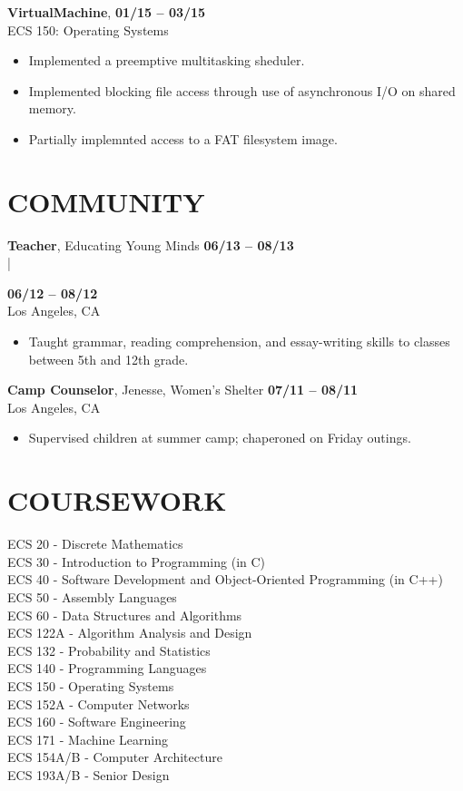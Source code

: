 \documentclass[line, letterpaper, 10pt]{res}
\begin{document}
\begin{resume}
    {\bf VirtualMachine}, \hfill  {\bf 01/15 -- 03/15} \\
    ECS 150: Operating Systems
    \begin{itemize} \itemsep -2pt
        \item Implemented a preemptive multitasking sheduler.
        \item Implemented blocking file access through use of asynchronous I/O on shared memory.
        \item Partially implemnted access to a FAT filesystem image.
    \end{itemize}

\section{COMMUNITY}
    {\bf Teacher}, Educating Young Minds \hfill {\bf 06/13 -- 08/13} \\
    |\raggedright{\hfill {\bf 06/12 -- 08/12}} \\
    Los Angeles, CA
    \begin{itemize} \itemsep -2pt
        \item Taught grammar, reading comprehension, and essay-writing skills to classes between 5th and 12th grade.
    \end{itemize}

    {\bf Camp Counselor}, Jenesse, Women's Shelter \hfill {\bf 07/11 -- 08/11} \\
    Los Angeles, CA
    \begin{itemize} \itemsep -2pt %
        \item Supervised children at summer camp; chaperoned on Friday outings.
    \end{itemize}

\section{COURSEWORK}
    ECS 20 - Discrete Mathematics \\
    ECS 30 - Introduction to Programming (in C) \\
    ECS 40 - Software Development and Object-Oriented Programming (in C++) \\
    ECS 50 - Assembly Languages \\
    ECS 60 - Data Structures and Algorithms \\
    ECS 122A - Algorithm Analysis and Design \\
    ECS 132 - Probability and Statistics \\
    ECS 140 - Programming Languages \\
    ECS 150 - Operating Systems \\
    ECS 152A - Computer Networks \\
    ECS 160 - Software Engineering \\
    ECS 171 - Machine Learning \\
    ECS 154A/B - Computer Architecture \\
    ECS 193A/B - Senior Design \\



\end{resume}
\end{document}

